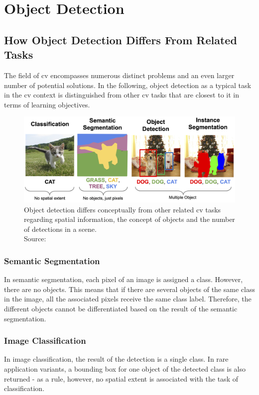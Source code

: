 \documentclass[
			   fontsize=11pt,
               paper=a4,
               bibliography=totoc,
               idxtotoc,
               headsepline,
               footsepline,
               footinclude=false,
               BCOR=12mm,
               DIV=13,
               openany,   %
               ]
               {scrbook}
\begin{document}
\chapter{Object Detection}

\section{How Object Detection Differs From Related Tasks}

The field of \gls{cv} encompasses numerous distinct problems and an even larger number of potential solutions. In the following, object detection as a typical task in the \gls{cv} context is distinguished from other \gls{cv} tasks that are closest to it in terms of learning objectives.

\begin{figure}[H] %
	\centering
	\includegraphics[width=\textwidth]{figures/detection_related_tasks.png}
	\caption[Typical Computer Vision Tasks]{Object detection differs conceptually from other related \gls{cv} tasks regarding spatial information, the concept of objects and the number of detections in a scene.\\
		\tiny{Source:~\cite{cvTasks}}}
	\label{fig:cvTasks} %
\end{figure}

\subsection{Semantic Segmentation}
In semantic segmentation, each pixel of an image is assigned a class. However, there are no objects. This means that if there are several objects of the same class in the image, all the associated pixels receive the same class label. Therefore, the different objects cannot be differentiated based on the result of the semantic segmentation.

\subsection{Image Classification}
In image classification, the result of the detection is a single class. In rare application variants, a bounding box for one object of the detected class is also returned - as a rule, however, no spatial extent is associated with the task of classification.
\end{document}
